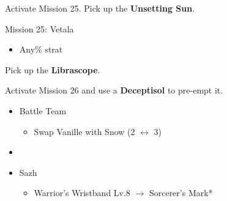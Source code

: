 Activate Mission 25.
Pick up the \textbf{Unsetting Sun}.

\begin{battle}{Mission 25: Vetala}
	\begin{itemize}
		\item Any\% strat
	\end{itemize}
\end{battle}

Pick up the \textbf{Librascope}.

Activate Mission 26 and use a \textbf{Deceptisol} to pre-empt it.

\begin{menu}
	\begin{itemize}
		\paradigm
		\begin{itemize}
			\item Battle Team
				\begin{itemize}
					\item Swap Vanille with Snow (2 $\leftrightarrow$ 3)
				\end{itemize}
			\item {}%
				  {\paradigmline{\syn}{(\sen)}{(\rav)}}%
			      {\paradigmline[4]{\com}{\rav}{\rav}}%
			      {\paradigmline{(\rav)}{(\sen)}{(\rav)}}%
			      {\paradigmline{\com}{\com}{\rav}}%
			      {\paradigmline{\rav}{(\sen)}{\sab}}%
			      {\paradigmline{\com}{\com}{(\rav)}}%
		\end{itemize}
		\equip
		\begin{itemize}
			\item Sazh
				\begin{itemize}
					\item Warrior's Wristband Lv.8 $\rightarrow$ Sorcerer's Mark*
				\end{itemize}
		\end{itemize}
	\end{itemize}
\end{menu}

\renewcommand{\first}{[1] Riot Shield (\syn/\sen/\rav)}
\renewcommand{\third}{[3] Mystic Tower (\rav/\sen/\rav)}
\renewcommand{\fourth}{[4] Aggression (\com/\com/\rav)}
\renewcommand{\fifth}{[5] Matador (\rav/\sen/\sab)}
\renewcommand{\sixth}{[6] Aggression (\com/\com/\rav)}


